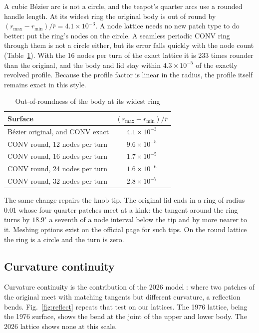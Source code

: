 \documentclass[journal]{IEEEtran}
\begin{document}
A cubic B\'ezier arc is not a circle, and the teapot's quarter arcs use a
rounded handle length. At its widest ring the original body is out of
round by $(r_{\max}-r_{\min})/\bar r=4.1\times10^{-3}$. A node lattice
needs no new patch type to do better: put the ring's nodes on the circle.
A seamless periodic CONV ring through them is not a circle either, but
its error falls quickly with the node count (Table~\ref{tab:round}).
With the 16 nodes per turn of the exact lattice it is 233 times rounder
than the original, and the body and lid stay within $4.3\times10^{-5}$ of
the exactly revolved profile. Because the profile factor is linear in the
radius, the profile itself remains exact in this style.

\begin{table}[H]
\caption{Out-of-roundness of the body at its widest ring}
\label{tab:round}
\centering
\scriptsize
\begin{tabular}{l|c}
\hline
Surface & $(r_{\max}-r_{\min})/\bar r$\\
\hline
B\'ezier original, and CONV exact & $4.1\times10^{-3}$\\
CONV round, 12 nodes per turn & $9.6\times10^{-5}$\\
CONV round, 16 nodes per turn & $1.7\times10^{-5}$\\
CONV round, 24 nodes per turn & $1.6\times10^{-6}$\\
CONV round, 32 nodes per turn & $2.8\times10^{-7}$\\
\hline
\end{tabular}
\end{table}

The same change repairs the knob tip. The original lid ends in a ring of
radius 0.01 whose four quarter patches meet at a kink: the tangent
around the ring turns by $18.9^\circ$ a seventh of a node interval below
the tip and by more nearer to it. Meshing options exist on the official
page for such tips. On the round lattice the ring is a circle and the
turn is zero.

\subsection{Curvature continuity}

Curvature continuity is the contribution of the 2026 model
\cite{yuksel2026}: where two patches of the original meet with matching
tangents but different curvature, a reflection bends. Fig.~\ref{fig:reflect}
repeats that test on our lattices. The 1976 lattice, being the 1976
surface, shows the bend at the joint of the upper and lower body. The 2026
lattice shows none at this scale.
\end{document}
